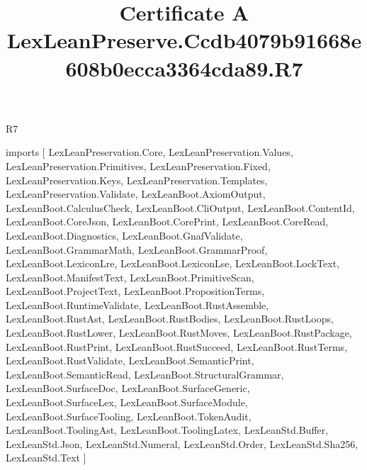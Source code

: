 \begin{lexlean}{R7}
\title{Certificate A LexLeanPreserve.Ccdb4079b91668e608b0ecca3364cda89.R7}
\begin{coremodule}
imports [
  LexLeanPreservation.Core,
  LexLeanPreservation.Values,
  LexLeanPreservation.Primitives,
  LexLeanPreservation.Fixed,
  LexLeanPreservation.Keys,
  LexLeanPreservation.Templates,
  LexLeanPreservation.Validate,
  LexLeanBoot.AxiomOutput,
  LexLeanBoot.CalculusCheck,
  LexLeanBoot.CliOutput,
  LexLeanBoot.ContentId,
  LexLeanBoot.CoreJson,
  LexLeanBoot.CorePrint,
  LexLeanBoot.CoreRead,
  LexLeanBoot.Diagnostics,
  LexLeanBoot.GnafValidate,
  LexLeanBoot.GrammarMath,
  LexLeanBoot.GrammarProof,
  LexLeanBoot.LexiconLre,
  LexLeanBoot.LexiconLse,
  LexLeanBoot.LockText,
  LexLeanBoot.ManifestText,
  LexLeanBoot.PrimitiveScan,
  LexLeanBoot.ProjectText,
  LexLeanBoot.PropositionTerms,
  LexLeanBoot.RuntimeValidate,
  LexLeanBoot.RustAssemble,
  LexLeanBoot.RustAst,
  LexLeanBoot.RustBodies,
  LexLeanBoot.RustLoops,
  LexLeanBoot.RustLower,
  LexLeanBoot.RustMoves,
  LexLeanBoot.RustPackage,
  LexLeanBoot.RustPrint,
  LexLeanBoot.RustSucceed,
  LexLeanBoot.RustTerms,
  LexLeanBoot.RustValidate,
  LexLeanBoot.SemanticPrint,
  LexLeanBoot.SemanticRead,
  LexLeanBoot.StructuralGrammar,
  LexLeanBoot.SurfaceDoc,
  LexLeanBoot.SurfaceGeneric,
  LexLeanBoot.SurfaceLex,
  LexLeanBoot.SurfaceModule,
  LexLeanBoot.SurfaceTooling,
  LexLeanBoot.TokenAudit,
  LexLeanBoot.ToolingAst,
  LexLeanBoot.ToolingLatex,
  LexLeanStd.Buffer,
  LexLeanStd.Json,
  LexLeanStd.Numeral,
  LexLeanStd.Order,
  LexLeanStd.Sha256,
  LexLeanStd.Text
]


\end{coremodule}
\end{lexlean}
